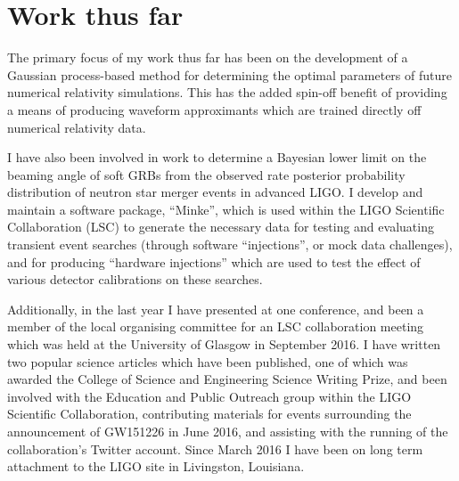 \documentclass[openleft]{kentigern}
\theoremstyle{definition}
\begin{document}




\chapter{Work thus far}
\chapterprecis{}
The primary focus of my work thus far has been on the development of a
Gaussian process-based method for determining the optimal parameters
of future numerical relativity simulations. This has the added
spin-off benefit of providing a means of producing waveform
approximants which are trained directly off numerical relativity data.

I have also been involved in work to determine a Bayesian lower limit
on the beaming angle of soft GRBs from the observed rate posterior
probability distribution of neutron star merger events in advanced
LIGO. I develop and maintain a software package, ``Minke'', which is
used within the LIGO Scientific Collaboration (LSC) to generate the
necessary data for testing and evaluating transient event searches
(through software ``injections'', or mock data challenges), and for
producing ``hardware injections'' which are used to test the effect of
various detector calibrations on these searches.

Additionally, in the last year I have presented at one conference, and
been a member of the local organising committee for an LSC
collaboration meeting which was held at the University of Glasgow in
September 2016. I have written two popular science articles which have
been published, one of which was awarded the College of Science and
Engineering Science Writing Prize, and been involved with the
Education and Public Outreach group within the LIGO Scientific
Collaboration, contributing materials for events surrounding the
announcement of GW151226 in June 2016, and assisting with the running
of the collaboration's Twitter account. Since March 2016 I have been
on long term attachment to the LIGO site in Livingston, Louisiana.
\end{document}
